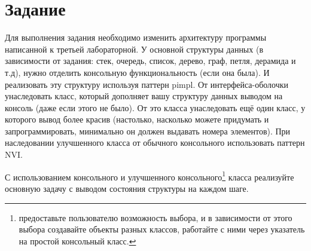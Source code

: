 \documentclass[12pt]{article}
\begin{document}
\section*{Задание}
Для выполнения задания необходимо изменить архитектуру программы написанной к третьей лабораторной. У основной 
структуры данных (в зависимости от задания: стек, очередь, список, дерево, граф, петля, дерамида и т.д), нужно отделить 
консольную функциональность (если она была). И реализовать эту структуру используя паттерн pimpl. От 
интерфейса-оболочки унаследовать класс, который дополняет вашу структуру данных выводом на консоль (даже если этого не 
было). От это класса унаследовать ещё один класс, у которого вывод более красив (настолько, насколько можете придумать и 
запрограммировать, минимально он должен выдавать номера элементов). При наследовании улучшенного класса от обычного 
консольного использовать паттерн NVI.

С использованием консольного и улучшенного консольного\footnote{предоставьте пользователю возможность выбора, и в 
зависимости от этого выбора создавайте объекты разных классов, работайте с ними через указатель на простой консольный 
класс.} класса реализуйте основную задачу с выводом состояния структуры на каждом шаге.
\end{document}
